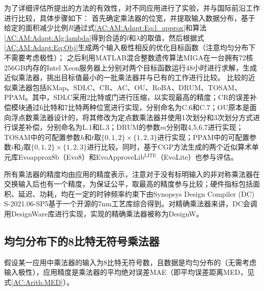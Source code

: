 为了详细评估所提出的方法的有效性，对不同应用进行了实验，并与国际前沿工作进行比较，具体步骤如下：
首先确定乘法器的位宽，并提取输入数据分布，基于给定的面积减少比例$R$通过式\eqref{AC:AM:Adapt:Eq:l_approx}和算法\ref{AC:AM:Adapt:Alg:lambda}得到合适的$l$和$\lambda$的取值，然后根据式\eqref{AC:AM:Adapt:Eq:Obj}生成两个输入极性相反的优化目标函数（注意均匀分布下不需要考虑极性）；
之后利用MATLAB混合整数遗传算法MIGA在一台拥有72核256GB内存的Intel Xeon服务器上分别对两个目标函数运行48小时进行求解，生成近似乘法器，挑出目标值最小的一批乘法器并与已有的工作进行比较。
比较的近似乘法器包括KMap\cite{AC:AM:KMap}、SDLC\cite{AC:AM:SDLC}、CR\cite{AC:AM:CR}、AC\cite{AC:AM:AC}、OU\cite{AC:AM:OU}、RoBA\cite{AC:AM:RoBA}、DRUM\cite{AC:AM:DRUM}、TOSAM\cite{AC:AM:TOSAM}、PPAM\cite{AC:AM:PPAM}。其中，SDLC采用2比特或门进行压缩，以实现最高的精度；CR的误差补偿模块通过6比特和7比特两种位宽进行实现，分别命名为C.6和C.7；OU原本是面向浮点数乘法器设计的，将其修改为定点数乘法器并使用1次划分和3次划分方式进行误差补偿，分别命名为L.1和L.3；DRUM的参数$m$分别取4,5,6,7进行实现；TOSAM中的可配置参数$h$和$t$取$\{0, 1, 2\} \times \{1, 2, 3\}$进行实现；PPAM中的可配置参数$i$和$j$取$\{0, 1, 2\} \times \{1, 2, 3\}$进行比较。同时，基于CGP方法生成的两个近似算术单元库Evoapprox8b（Evo8）\cite{AC:AM:CGP_Evoapprox8b}和EvoApproveLib$^\text{LITE}$（EvoLite）\cite{AC:AM:CGP_EvoLite}也参与评估。

所有乘法器的精度均由应用的精度表示，注意对于没有标明输入的非对称乘法器在交换输入后也有一个精度，为保证公平，取最高的精度参与比较；硬件指标包括面积、延迟、功耗，均在一定的时钟频率约束下由Synopsys Design Compiler (DC) S-2021.06-SP5基于一个开源的7nm工艺库\cite{ASAP7_github}综合得到。对精确乘法器来讲，DC会调用DesignWare库\cite{IP:DesignWare}进行实现，实现的精确乘法器被称为DesignW。


\subsection{均匀分布下的8比特无符号乘法器}

假设某一应用中乘法器的输入为8比特无符号数，且数据是均匀分布的（无需考虑输入极性），应用精度是乘法器的平均绝对误差MAE（即平均误差距离MED，见式\eqref{AC:Arith:MED}）。


